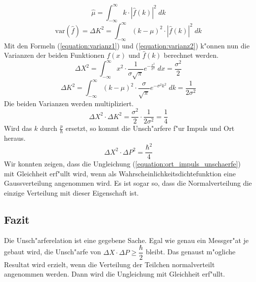 \begin{refsection}
\begin{equation}
	\hat{\mu} = \int_{-\infty}^{\infty} k \cdot  |\hat{f}(k)|^{2}\; dk
\end{equation}
\begin{equation}	
	\text{var}(\hat{f}) = \varDelta K^{2}  = \int_{-\infty}^{\infty} (k-\mu)^{2} \cdot  |\hat{f}(k)|^{2} \; dk
	\label{equation:varianz2}
\end{equation}
Mit den Formeln (\ref{equation:varianz1}) und (\ref{equation:varianz2}) k"onnen nun die Varianzen der beiden Funktionen $f(x)$ und $\hat{f}(k)$ berechnet werden.
\begin{equation}	
	\varDelta X^{2} = \int_{-\infty}^{\infty} x^{2} \cdot \dfrac{1}{\sigma \sqrt{\pi}}e^{-\frac{x^{2}}{\sigma^{2}}} \; dx = \frac{\sigma^{2}}{2}
\end{equation}
\begin{equation}	
	\varDelta K^{2} = \int_{-\infty}^{\infty} (k-\mu)^{2} \cdot  \dfrac{\sigma}{\sqrt{\pi} }e^{-\sigma^{2} k^{2}} \; dk = \dfrac{1}{2\sigma^{2}}
\end{equation}
Die beiden Varianzen werden multipliziert.
\begin{equation}	
	\varDelta X^{2} \cdot \varDelta K^{2} = \frac{\sigma^{2}}{2} \cdot \dfrac{1}{2\sigma^{2}} = \dfrac{1}{4}
\end{equation}
Wird das $k$ durch $\frac{p}{\hbar}$ ersetzt, so kommt die Unsch"arfere f"ur Impuls und Ort heraus.
\begin{equation}	
	\varDelta X^{2} \cdot \varDelta P^{2} = \dfrac{\hbar^{2}}{4}
\end{equation}
Wir konnten zeigen, dass die Ungleichung (\ref{equation:ort_impuls_unschaerfe}) mit Gleichheit erf"ullt wird, wenn als Wahrscheinlichkeitsdichtefunktion eine Gaussverteilung angenommen wird.
Es ist sogar so, dass die Normalverteilung die einzige Verteilung mit dieser Eigenschaft ist.

\subsection{Fazit}

Die Unsch"arferelation ist eine gegebene Sache. Egal wie genau ein Messger"at je gebaut wird, die Unsch"arfe von $\varDelta X \cdot \varDelta P \geq \dfrac{\hbar}{2}$ bleibt. Das genaust m"ogliche Resultat wird erzielt, wenn die Verteilung der Teilchen normalverteilt angenommen werden. Dann wird die Ungleichung mit Gleichheit erf"ullt.

\printbibliography[heading=subbibliography]
\end{refsection}

